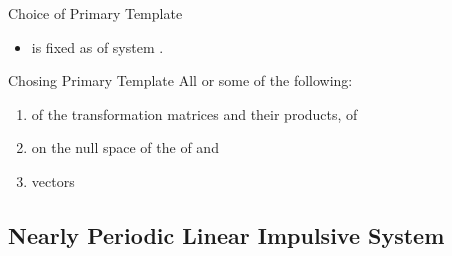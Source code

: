 \begin{frame}{Choice of Primary Template}
\begin{itemize}
\item {} is fixed as  of system .\pause
\end{itemize}
\begin{block}{Chosing Primary Template}
All or some of the following:\pause
\begin{enumerate}
\item {} of the transformation matrices and their products,  of 
\item  {}  on the null space of
   the  of  and   
\item  {} vectors
\end{enumerate}
\end{block}

\end{frame}

\subsection{Nearly Periodic Linear Impulsive System}


